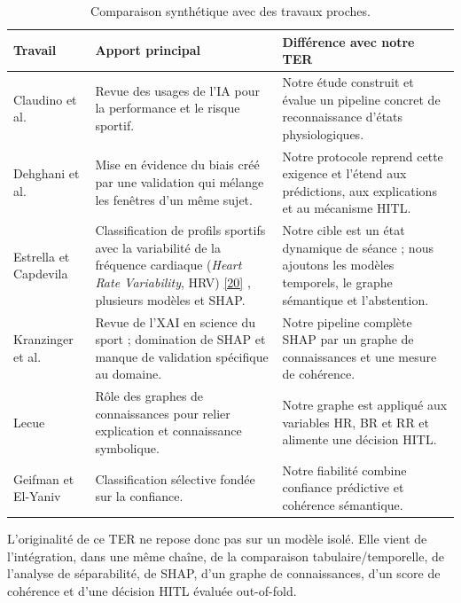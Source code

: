 \documentclass[12pt,a4paper]{article}
\newcommand{\openaccessref}[2]{%
  \nobreak\hspace{0.08em}%
  \href{#2}{\textcolor{green!35!black}{[#1]}}%
}
\begin{document}
\begin{table}[H]
\centering
\caption{Comparaison synthétique avec des travaux proches.}
\label{tab:related_work}
\begin{tabularx}{\linewidth}{p{2.8cm}XX}
\toprule
\textbf{Travail} & \textbf{Apport principal} & \textbf{Différence avec notre TER} \\
\midrule
Claudino et al.~\cite{claudino2019}
& Revue des usages de l'IA pour la performance et le risque sportif.
& Notre étude construit et évalue un pipeline concret de reconnaissance
d'états physiologiques. \\

Dehghani et al.~\cite{dehghani2019}
& Mise en évidence du biais créé par une validation qui mélange les fenêtres
d'un même sujet.
& Notre protocole reprend cette exigence et l'étend aux prédictions, aux
explications et au mécanisme HITL. \\

Estrella et Capdevila~\cite{estrella2025}
& Classification de profils sportifs avec la variabilité de la fréquence cardiaque
(\emph{Heart Rate Variability}, HRV)\openaccessref{20}{https://www.mdpi.com/2075-4663/13/2/30}, plusieurs modèles et SHAP.
& Notre cible est un état dynamique de séance ; nous ajoutons les modèles
temporels, le graphe sémantique et l'abstention. \\

Kranzinger et al.~\cite{kranzinger2025}
& Revue de l'XAI en science du sport ; domination de SHAP et manque de
validation spécifique au domaine.
& Notre pipeline complète SHAP par un graphe de connaissances et une mesure de
cohérence. \\

Lecue~\cite{lecue2020}
& Rôle des graphes de connaissances pour relier explication et connaissance
symbolique.
& Notre graphe est appliqué aux variables HR, BR et RR et alimente une
décision HITL. \\

Geifman et El-Yaniv~\cite{geifman2017}
& Classification sélective fondée sur la confiance.
& Notre fiabilité combine confiance prédictive et cohérence sémantique. \\
\bottomrule
\end{tabularx}
\end{table}

L'originalité de ce TER ne repose donc pas sur un modèle isolé. Elle vient de
l'intégration, dans une même chaîne, de la comparaison tabulaire/temporelle,
de l'analyse de séparabilité, de SHAP, d'un graphe de connaissances, d'un
score de cohérence et d'une décision HITL évaluée out-of-fold.
\FloatBarrier
\end{document}
